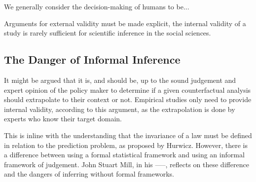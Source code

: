 \documentclass[a4paper,12pt]{article}
\begin{document}
We generally consider the decision-making of humans to be...

Arguments for external validity must be made explicit, the internal validity of a study is rarely sufficient for scientific inference in the social sciences. 




 


\subsection*{The Danger of Informal Inference}

 
%

It might be argued that it is, and should be, up to the sound judgement and expert opinion of the policy maker to determine if a given counterfactual analysis should extrapolate to their context or not. Empirical studies only need to provide internal validity, according to this argument, as the extrapolation is done by experts who know their target domain. 

This is inline with the understanding that the invariance of a law must be defined in relation to the prediction problem, as proposed by Hurwicz. However, there is a difference between using a formal statistical framework and using an informal framework of judgement. John Stuart Mill, in his -----, reflects on these difference and the dangers of inferring without formal frameworks. 
\end{document}

